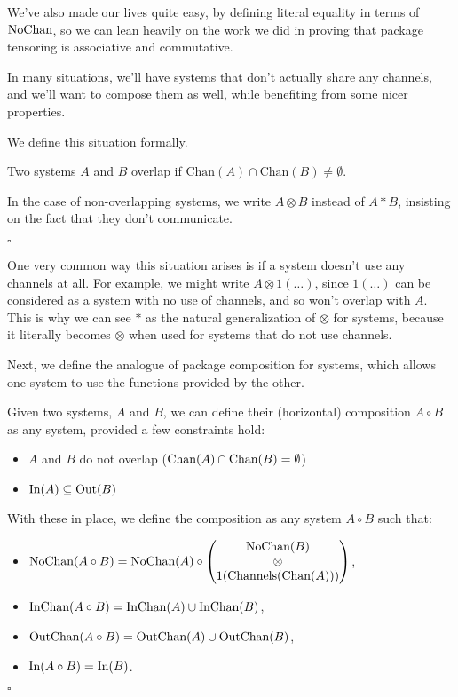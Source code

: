 We've also made our lives quite easy, by defining literal
equality in terms of $\text{NoChan}$, so we can lean
heavily on the work we did in proving that package tensoring
is associative and commutative.

In many situations, we'll have systems that don't actually share
any channels, and we'll want to compose them as well, while
benefiting from some nicer properties.

We define this situation formally.

\begin{definition}
Two systems $A$ and $B$ overlap if $\text{Chan}(A) \cap \text{Chan}(B) \neq \emptyset$.

In the case of non-overlapping systems, we write $A \otimes B$ instead of $A * B$,
insisting on the fact that they don't communicate.

$\square$
\end{definition}

One very common way this situation arises is if a system doesn't
use any channels at all.
For example, we might write $A \otimes 1(\ldots)$,
since $1(\ldots)$ can be considered as a system with no use of channels,
and so won't overlap with $A$.
This is why we can see $*$ as the natural generalization of $\otimes$
for systems, because it literally becomes $\otimes$ when used
for systems that do not use channels.

Next, we define the analogue of package composition for systems,
which allows one system to use the functions provided by the other.

\begin{definition}
Given two systems, $A$ and $B$, we can define their (horizontal) composition
$A \circ B$ as any system, provided a few constraints hold:
\begin{itemize}
\item $A$ and $B$ do not overlap ($\text{Chan}(A) \cap \text{Chan}(B) = \emptyset$)
\item $\text{In}(A) \subseteq \text{Out}(B)$
\end{itemize}

With these in place, we define the composition as any system $A \circ B$ such that:
\begin{itemize}
  \item $\text{NoChan}(A \circ B) = \text{NoChan}(A) \circ \begin{pmatrix}
    \text{NoChan}(B)\cr
    \otimes\cr
    1(\text{Channels}(\text{Chan}(A)))
  \end{pmatrix}
    $,
  \item $\text{InChan}(A \circ B) = \text{InChan}(A) \cup \text{InChan}(B)$,
  \item $\text{OutChan}(A \circ B) = \text{OutChan}(A) \cup \text{OutChan}(B)$,
  \item $\text{In}(A \circ B) = \text{In}(B)$.
\end{itemize}

$\square$
\end{definition}

